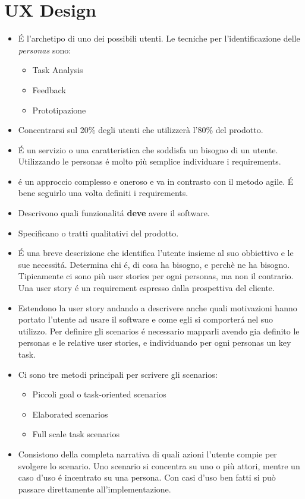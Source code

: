 \chapter{UX Design}

\begin{itemize}
    \item {} \'E l'archetipo di uno dei possibili utenti. Le tecniche per l'identificazione delle \textit{personas} sono:
    \begin{itemize}
        \item Task Analysis
        \item Feedback
        \item Prototipazione
    \end{itemize}
    \item {} Concentrarsi sul 20\% degli utenti che utilizzer\`a l'80\% del prodotto.
    \item {} \'E un servizio o una caratteristica che soddisfa un bisogno di un utente. Utilizzando le personas \'e molto pi\`u semplice individuare i requirements.
    \item {} \'e un approccio complesso e oneroso e va in contrasto con il metodo agile. \'E bene seguirlo una volta definiti i requirements.
    \item {} Descrivono quali funzionalit\'a \textbf{deve} avere il software.
    \item {} Specificano o tratti qualitativi del prodotto.
    \item {} \'E una breve descrizione che identifica l'utente insieme al suo obbiettivo e le sue necessit\'a. Determina chi \'e, di cosa ha bisogno, e perch\`e ne ha bisogno. Tipicamente ci sono pi\`u user stories per ogni personas, ma non il contrario. Una user story \'e un requirement espresso dalla prospettiva del cliente.
    \item {} Estendono la user story andando a descrivere anche quali motivazioni hanno portato l'utente ad usare il software e come egli si comporter\'a nel suo utilizzo. Per definire gli scenarios \'e necessario mapparli avendo gia definito le personas e le relative user stories, e individuando per ogni personas un key task.
    \item Ci sono tre metodi principali per scrivere gli scenarios:
    \begin{itemize}
        \item Piccoli goal o task-oriented scenarios
        \item Elaborated scenarios
        \item Full scale task scenarios
    \end{itemize}
    \item {} Consistono della completa narrativa di quali azioni l'utente compie per svolgere lo scenario. Uno scenario si concentra su uno o pi\`u attori, mentre un caso d'uso \'e incentrato su una persona. Con casi d'uso ben fatti si pu\`o passare direttamente all'implementazione.
\end{itemize}